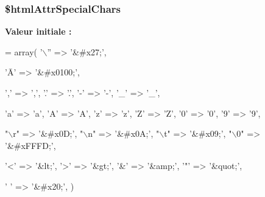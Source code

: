 \subsubsection[{\texorpdfstring{\$html\+Attr\+Special\+Chars}{$htmlAttrSpecialChars}}]{\setlength{\rightskip}{0pt plus 5cm}\$html\+Attr\+Special\+Chars\hspace{0.3cm}{\ttfamily [protected]}}\hypertarget{class_twig___test___escaping_test_ac10fba7cbb2208f03852bfaed09f18b6}{}\label{class_twig___test___escaping_test_ac10fba7cbb2208f03852bfaed09f18b6}
{\bfseries Valeur initiale \+:}
\begin{DoxyCode}
= array(
        \textcolor{charliteral}{'\(\backslash\)''} => \textcolor{stringliteral}{'&#x27;'},
        
        \textcolor{stringliteral}{'Ā'} => \textcolor{stringliteral}{'&#x0100;'},
        
        \textcolor{charliteral}{','} => \textcolor{charliteral}{','},
        \textcolor{charliteral}{'.'} => \textcolor{charliteral}{'.'},
        \textcolor{charliteral}{'-'} => \textcolor{charliteral}{'-'},
        \textcolor{charliteral}{'\_'} => \textcolor{charliteral}{'\_'},
        
        \textcolor{charliteral}{'a'} => \textcolor{charliteral}{'a'},
        \textcolor{charliteral}{'A'} => \textcolor{charliteral}{'A'},
        \textcolor{charliteral}{'z'} => \textcolor{charliteral}{'z'},
        \textcolor{charliteral}{'Z'} => \textcolor{charliteral}{'Z'},
        \textcolor{charliteral}{'0'} => \textcolor{charliteral}{'0'},
        \textcolor{charliteral}{'9'} => \textcolor{charliteral}{'9'},
        
        \textcolor{stringliteral}{"\(\backslash\)r"} => \textcolor{stringliteral}{'&#x0D;'},
        \textcolor{stringliteral}{"\(\backslash\)n"} => \textcolor{stringliteral}{'&#x0A;'},
        \textcolor{stringliteral}{"\(\backslash\)t"} => \textcolor{stringliteral}{'&#x09;'},
        \textcolor{stringliteral}{"\(\backslash\)0"} => \textcolor{stringliteral}{'&#xFFFD;'}, 
        
        \textcolor{charliteral}{'<'} => \textcolor{stringliteral}{'&lt;'},
        \textcolor{charliteral}{'>'} => \textcolor{stringliteral}{'&gt;'},
        \textcolor{charliteral}{'&'} => \textcolor{stringliteral}{'&amp;'},
        \textcolor{charliteral}{'"'} => \textcolor{stringliteral}{'&quot;'},
        
        \textcolor{charliteral}{' '} => \textcolor{stringliteral}{'&#x20;'},
    )
\end{DoxyCode}


